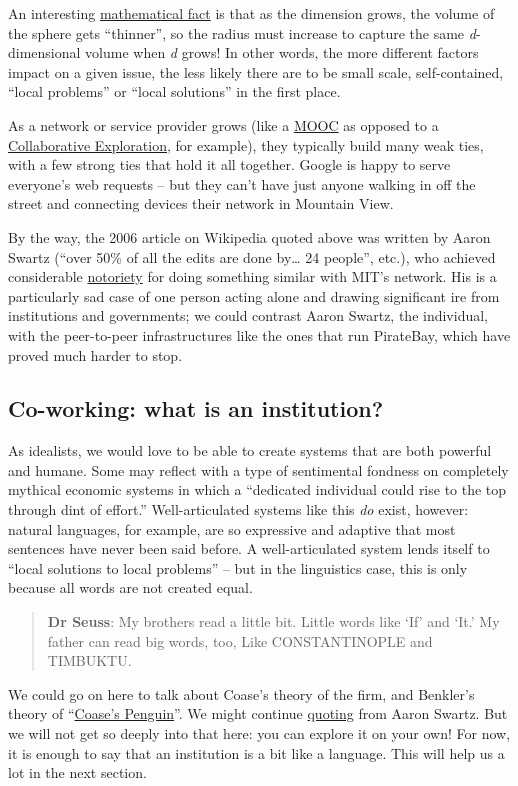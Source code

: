 An interesting
\href{http://en.wikipedia.org/wiki/N-sphere\#Volume\_and\_surface\_area}{mathematical
fact} is that as the dimension grows, the volume of the sphere gets
``thinner'', so the radius must increase to capture the same
\emph{d}-dimensional volume when \emph{d} grows! In other words, the
more different factors impact on a given issue, the less likely there
are to be small scale, self-contained, ``local problems'' or ``local
solutions'' in the first place.

As a network or service provider grows (like a
\href{http://peeragogy.org/organize/connectivism-in-practice-how-to-organize-a-mooc/}{MOOC}
as opposed to a
\href{http://peeragogy.org/case-study-collaborative-explorations/}{Collaborative
Exploration}, for example), they typically build many weak ties, with a
few strong ties that hold it all together. Google is happy to serve
everyone's web requests -- but they can't have just anyone walking in
off the street and connecting devices their network in Mountain View. 

By the way, the 2006 article on Wikipedia quoted above was written
by Aaron Swartz (``over 50\% of all the edits are done by\ldots{} 24
people'', etc.), who achieved considerable
\href{http://www.wired.com/threatlevel/2011/07/swartz-arrest/}{notoriety}
for doing something similar with MIT's network. His is a particularly
sad case of one person acting alone and drawing significant ire from
institutions and governments; we could contrast Aaron Swartz, the
individual, with the peer-to-peer infrastructures like the ones that
run PirateBay, which have proved much harder to stop.

\subsection{Co-working: what is an institution?}

As idealists, we would love to be able to create systems that are both
powerful and humane. Some may reflect with a type of sentimental
fondness on completely mythical economic systems in which a ``dedicated
individual could rise to the top through dint of effort.''
Well-articulated systems like this \emph{do} exist, however: natural
languages, for example, are so expressive and adaptive that most
sentences have never been said before. A well-articulated system lends
itself to ``local solutions to local problems'' -- but in the
linguistics case, this is only because all words are not created equal.

\begin{quote}
\textbf{Dr Seuss}: My brothers read a little bit. Little words like `If'
and `It.' My father can read big words, too, Like CONSTANTINOPLE and
TIMBUKTU.
\end{quote}
We could go on here to talk about Coase's theory of the firm, and
Benkler's theory of
``\href{http://www.yale.edu/yalelj/112/BenklerWEB.pdf}{Coase's Penguin}''.
We might continue
\href{http://www.aaronsw.com/weblog/perfectinstitutions}{quoting} from
Aaron Swartz. But we will not get so deeply into that here: you can
explore it on your own! For now, it is enough to say that an institution
is a bit like a language. This will help us a lot in the next section.

